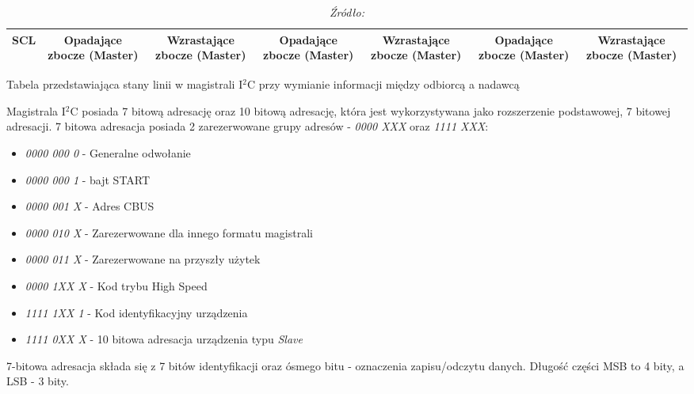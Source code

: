 \documentclass[12pt,a4paper,oneside]{memoir}
\begin{document}
\begin{table}[!h]
{\begin{tabular}{|c|c|c|c|c|c|c|}
	\cellcolor[HTML]{EFEFEF}\textbf{SCL} & \textbf{Opadające zbocze (Master)} & \textbf{Wzrastające zbocze (Master)} & \textbf{Opadające zbocze (Master)} & \textbf{Wzrastające zbocze (Master)} & \textbf{Opadające zbocze (Master)} & \textbf{Wzrastające zbocze (Master)} \\ \hline
\end{tabular}%
}
	{\tytulyrozdzialow \footnotesize \caption[I$^2$C - Stany magistrali przy przesyle danych] {Tabela przedstawiająca stany linii w magistrali I$^2$C przy wymianie informacji między odbiorcą a nadawcą}}
	\caption*{\textit{Źródło: \cite{i2cwiki}}}
\end{table}
Magistrala I$^2$C posiada 7 bitową adresację oraz 10 bitową adresację, która jest wykorzystywana jako rozszerzenie podstawowej, 7 bitowej adresacji. 7 bitowa adresacja posiada 2 zarezerwowane grupy adresów - \textit{0000 XXX} oraz \textit{1111 XXX}:
\begin{itemize}
	\item \textit{0000 000 0} - Generalne odwołanie
	\item \textit{0000 000 1} - bajt START
	\item \textit{0000 001 X} - Adres CBUS
	\item \textit{0000 010 X} - Zarezerwowane dla innego formatu magistrali
	\item \textit{0000 011 X} - Zarezerwowane na przyszły użytek
	\item \textit{0000 1XX X} - Kod trybu High Speed
	\item \textit{1111 1XX 1} - Kod identyfikacyjny urządzenia
	\item \textit{1111 0XX X} - 10 bitowa adresacja urządzenia typu \textit{Slave}
\end{itemize}
7-bitowa adresacja składa się z 7 bitów identyfikacji oraz ósmego bitu - oznaczenia zapisu/odczytu danych. Długość części MSB to 4 bity, a LSB - 3 bity.
\end{document}
